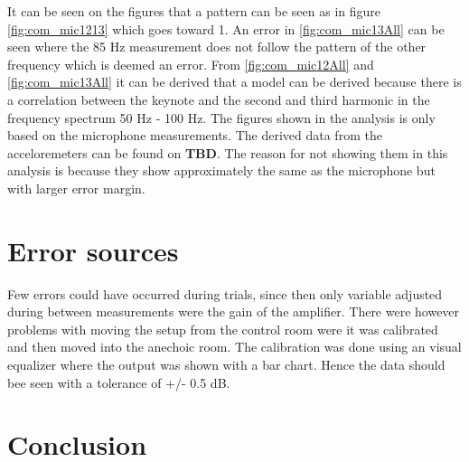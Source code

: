 It can be seen on the figures that a pattern can be seen as in figure \autoref{fig:com_mic1213} which goes toward 1. An error in \autoref{fig:com_mic13All} can be seen where the 85 Hz measurement does not follow the pattern of the other frequency which is deemed an error. From \autoref{fig:com_mic12All} and \autoref{fig:com_mic13All} it can be derived that a model can be derived because there is a correlation between the keynote and the second and third harmonic in the frequency spectrum 50 Hz - 100 Hz. The figures shown in the analysis is only based on the microphone measurements. The derived data from the acceloremeters can be found on \textbf{TBD}. The reason for not showing them in this analysis is because they show approximately the same as the microphone but with larger error margin. 


\section{Error sources}
Few errors could have occurred during trials, since then only variable adjusted during between measurements were the gain of the amplifier. There were however problems with moving the setup from the control room were it was calibrated and then moved into the anechoic room. The
calibration was done using an visual equalizer where the output was shown with a bar chart. Hence the data should bee seen with a tolerance of +/- 0.5 dB.

\section{Conclusion}

